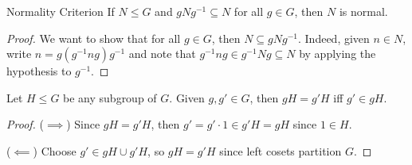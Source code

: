 \documentclass{article}
\theoremstyle{plain}
\begin{document}
\begin{theorem}{Normality Criterion}{}\label{nc}
If $N \le G$ and $gNg^{-1} \subseteq N$ for all $g\in G$, then $N$ is normal.
\end{theorem}
\begin{proof}
We want to show that for all $g \in G$, then $N \subseteq gNg^{-1}$. Indeed, given $n \in N$, write $n = g(g^{-1}ng)g^{-1}$ and note that $g^{-1}ng \in g^{-1}Ng \subseteq N$ by applying the hypothesis to $g^{-1}$.
\end{proof}
\begin{lemma}{}{}
Let $H \le G$ be any subgroup of $G$. Given $g,g' \in G$, then $gH = g'H$ iff $g'\in gH$.
\end{lemma}
\begin{proof}
($\implies$) Since $gH = g'H$, then $g'=g'\cdot 1 \in g'H = gH$ since $1 \in H$.

($\impliedby$) Choose $g' \in gH \cup g'H$, so $gH = g'H$ since left cosets partition $G$.
\end{proof}
\end{document}
